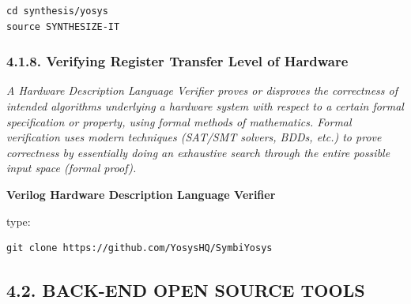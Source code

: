 \documentclass[
]{article}
\begin{document}
\begin{verbatim}
cd synthesis/yosys
source SYNTHESIZE-IT
\end{verbatim}

\hypertarget{verifying-register-transfer-level-of-hardware-1}{%
\subsubsection{4.1.8. Verifying Register Transfer Level of
Hardware}\label{verifying-register-transfer-level-of-hardware-1}}

\emph{A Hardware Description Language Verifier proves or disproves the
correctness of intended algorithms underlying a hardware system with
respect to a certain formal specification or property, using formal
methods of mathematics. Formal verification uses modern techniques
(SAT/SMT solvers, BDDs, etc.) to prove correctness by essentially doing
an exhaustive search through the entire possible input space (formal
proof).}

\textbf{Verilog Hardware Description Language Verifier}

type:

\begin{verbatim}
git clone https://github.com/YosysHQ/SymbiYosys
\end{verbatim}

\hypertarget{back-end-open-source-tools-2}{%
\subsection{4.2. BACK-END OPEN SOURCE
TOOLS}\label{back-end-open-source-tools-2}}
\end{document}
